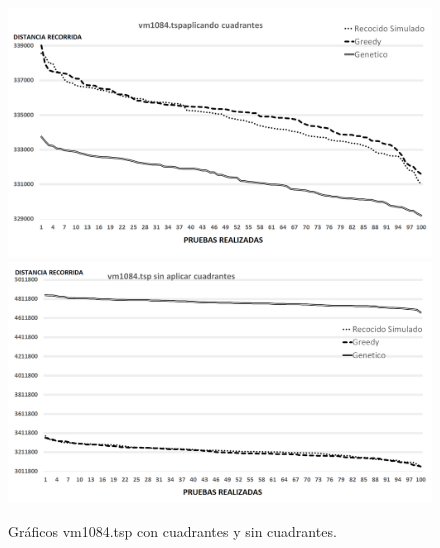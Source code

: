  \begin{figure}[hbtp]
    \centering
        \includegraphics[width=1\textwidth]{PruebasResultados/Experimentos_Graficos_Con/vm1084.png}
        \includegraphics[width=1\textwidth]{PruebasResultados/Experimentos_Graficos_Sin/vm1084.png}
        \caption{Gráficos vm1084.tsp con cuadrantes y sin cuadrantes.}
        \label{fig:vm1084_grafica.png}
\end{figure}
\newpage

       

    
